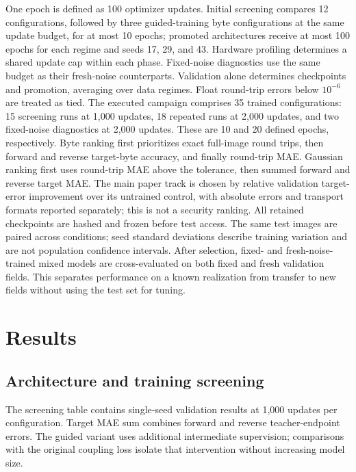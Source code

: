 \documentclass[10pt]{article}
\begin{document}
One epoch is defined as 100 optimizer updates. Initial screening compares 12 configurations,
followed by three guided-training byte configurations at the same update budget,
for at most 10 epochs; promoted architectures receive at most 100 epochs for each
regime and seeds 17, 29, and 43. Hardware profiling determines a shared update cap
within each phase. Fixed-noise diagnostics use the same budget as their fresh-noise
counterparts. Validation alone determines checkpoints and promotion, averaging
over data regimes. Float round-trip errors below $10^{-6}$ are treated as tied.
The executed campaign comprises 35 trained configurations: 15 screening runs at
1,000 updates, 18 repeated runs at 2,000 updates, and two fixed-noise diagnostics
at 2,000 updates. These are 10 and 20 defined epochs, respectively.
Byte ranking first prioritizes exact full-image round trips, then forward and
reverse target-byte accuracy, and finally round-trip MAE. Gaussian ranking first
uses round-trip MAE above the tolerance, then summed forward and reverse target MAE.
The main paper track is chosen by relative validation target-error improvement
over its untrained control, with absolute errors and transport formats reported
separately; this is not a security ranking.
All retained checkpoints are hashed and frozen before test access. The same test
images are paired across conditions; seed standard deviations describe training
variation and are not population confidence intervals.
After selection, fixed- and fresh-noise-trained mixed models are cross-evaluated
on both fixed and fresh validation fields. This separates performance on a known
realization from transfer to new fields without using the test set for tuning.

\section{Results}
\subsection{Architecture and training screening}
The screening table contains single-seed validation results at 1,000 updates per
configuration. Target MAE sum combines forward and reverse teacher-endpoint errors.
The guided variant uses additional intermediate supervision; comparisons with
the original coupling loss isolate that intervention without increasing model size.
\end{document}

